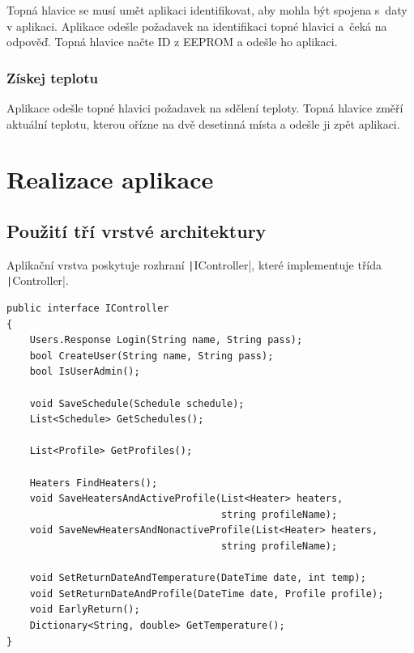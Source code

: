 \documentclass[thesis=B,czech]{FITthesis}[2012/10/20]
\begin{document}
Topná hlavice se musí umět aplikaci identifikovat, aby mohla být spojena s~daty v aplikaci. Aplikace odešle požadavek na identifikaci topné hlavici a~čeká na odpověď. Topná hlavice načte ID z EEPROM a odešle ho aplikaci.

\subsection{Získej teplotu}

Aplikace odešle topné hlavici požadavek na sdělení teploty. Topná hlavice změří aktuální teplotu, kterou ořízne na dvě desetinná místa a odešle ji zpět aplikaci.

\chapter{Realizace aplikace}

\section{Použití tří vrstvé architektury}



Aplikační vrstva poskytuje rozhraní \texttt|IController|, které implementuje třída \texttt|Controller|.

\begin{verbatim}
public interface IController
{
    Users.Response Login(String name, String pass);
    bool CreateUser(String name, String pass);
    bool IsUserAdmin();

    void SaveSchedule(Schedule schedule);
    List<Schedule> GetSchedules();

    List<Profile> GetProfiles();

    Heaters FindHeaters();
    void SaveHeatersAndActiveProfile(List<Heater> heaters,
                                     string profileName);
    void SaveNewHeatersAndNonactiveProfile(List<Heater> heaters,
                                     string profileName);

    void SetReturnDateAndTemperature(DateTime date, int temp);
    void SetReturnDateAndProfile(DateTime date, Profile profile);
    void EarlyReturn();
    Dictionary<String, double> GetTemperature();
}
\end{verbatim}
\end{document}
